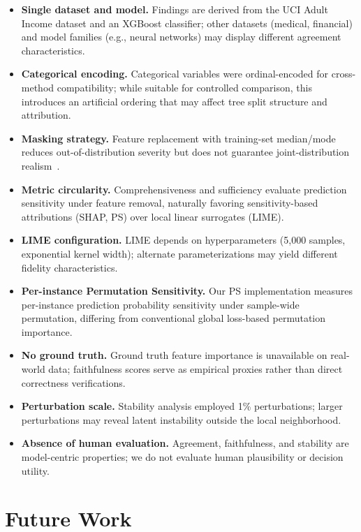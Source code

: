 \documentclass[conference, 10pt]{IEEEtran}
\begin{document}
\begin{itemize}[leftmargin=*,itemsep=0.5pt,parsep=0pt,topsep=1pt]
    \item \textbf{Single dataset and model.} Findings are derived from the UCI Adult Income dataset and an XGBoost classifier; other datasets (medical, financial) and model families (e.g., neural networks) may display different agreement characteristics.
    \item \textbf{Categorical encoding.} Categorical variables were ordinal-encoded for cross-method compatibility; while suitable for controlled comparison, this introduces an artificial ordering that may affect tree split structure and attribution.
    \item \textbf{Masking strategy.} Feature replacement with training-set median/mode reduces out-of-distribution severity but does not guarantee joint-distribution realism~\cite{hooker2019benchmark}.
    \item \textbf{Metric circularity.} Comprehensiveness and sufficiency evaluate prediction sensitivity under feature removal, naturally favoring sensitivity-based attributions (SHAP, PS) over local linear surrogates (LIME).
    \item \textbf{LIME configuration.} LIME depends on hyperparameters (5,000 samples, exponential kernel width); alternate parameterizations may yield different fidelity characteristics.
    \item \textbf{Per-instance Permutation Sensitivity.} Our PS implementation measures per-instance prediction probability sensitivity under sample-wide permutation, differing from conventional global loss-based permutation importance.
    \item \textbf{No ground truth.} Ground truth feature importance is unavailable on real-world data; faithfulness scores serve as empirical proxies rather than direct correctness verifications.
    \item \textbf{Perturbation scale.} Stability analysis employed 1\% perturbations; larger perturbations may reveal latent instability outside the local neighborhood.
    \item \textbf{Absence of human evaluation.} Agreement, faithfulness, and stability are model-centric properties; we do not evaluate human plausibility or decision utility.
\end{itemize}

\section{Future Work}
\label{sec:future-work}
\end{document}
